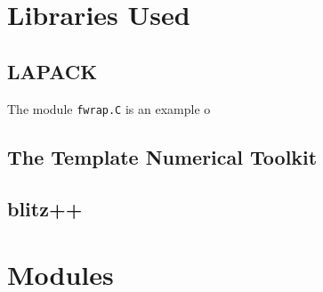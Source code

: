 \section{Libraries Used}

\subsection{LAPACK}
The module \texttt{fwrap.C} is an example o

\subsection{The Template Numerical Toolkit}

\subsection{blitz++}


\section{Modules}


